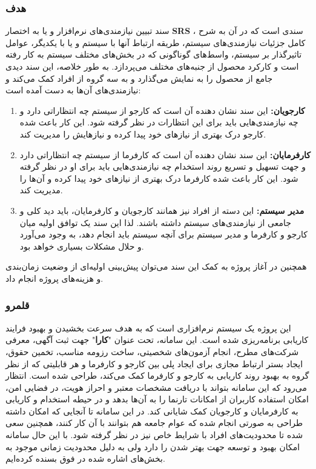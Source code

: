\documentclass[12pt]{article}
\begin{document}
	\subsubsection{هدف}
	سند تبیین نیازمندی‌های نرم‌افزار و یا به اختصار
	\textbf{SRS}
	، سندی است که در آن به شرح کامل جزئیات نیازمندی‌های سیستم، طریقه ارتباط آنها با سیستم و یا با یکدیگر، عوامل تاثیرگذار بر سیستم، واسط‌های گوناگونی که در بخش‌های مختلف سیستم به کار رفته است و کارکرد محصول از جنبه‌های مختلف می‌پردازد.
	به طور خلاصه، این سند دیدی جامع از محصول را به نمایش می‌گذارد و به سه گروه از افراد کمک می‌کند و نیازمندی‌های آن‌ها به دست آمده است:

	\begin{enumerate}
		\item
		\textbf{کارجویان:}
		این سند نشان‌ دهنده آن است که کارجو از سیستم چه انتظاراتی دارد و چه نیازمندی‌هایی باید برای این انتظارات در نظر گرفته شود. این کار باعث شده کارجو درک بهتری از نیازهای خود پیدا کرده و نیازهایش را مدیریت کند.
		\item
		\textbf{کارفرمایان:}
		این سند نشان دهنده آن است که کارفرما از سیستم چه انتظاراتی دارد و جهت تسهیل و تسریع روند استخدام چه نیازمندی‌هایی باید برای او در نظر گرفته شود. این کار باعث شده کارفرما درک بهتری از نیاز‌های خود پیدا کرده و آن‌ها را مدیریت کند.
		\item
		\textbf{مدیر سیستم:}
		این دسته از افراد نیز همانند کارجویان و کارفرمایان، باید دید کلی و جامعی از نیازمندی‌های سیستم داشته باشند. لذا این سند یک توافق اولیه میان کارجو و کارفرما و مدیر سیستم برای آنچه سیستم باید انجام دهد، به وجود می‌آورد و حلال مشکلات بسیاری خواهد بود.
	\end{enumerate}
	همچنین در آغاز پروژه به کمک این سند می‌توان پیش‌بینی اولیه‌ای از وضعیت زمان‌بندی و هزینه‌های پروژه انجام داد.

	\subsubsection{قلمرو}
	 این پروژه یک سیستم نرم‌افزاری است که به هدف سرعت بخشیدن و بهبود فرایند کاریابی برنامه‌ریزی شده است.
	این سامانه، تحت عنوان "\textbf{کارا}" جهت ثبت آگهی، معرفی شرکت‌های مطرح، انجام آزمون‌های شخصیتی، ساخت رزومه مناسب، تخمین حقوق، ایجاد بستر ارتباط مجازی برای ایجاد پلی بین کارجو و کارفرما و هر قابلیتی که از نظر گروه به بهبود روند کاریابی به کارجو و کارفرما کمک می‌کند، طراحی شده است.
	انتظار می‌رود که این سامانه بتواند با دریافت مشخصات معتبر و احراز هویت، در فضایی امن، امکان استفاده کاربران از امکانات تارنما را به آن‌ها بدهد و در حیطه استخدام و کاریابی به کارفرمایان و کارجویان کمک شایانی کند.
	در این سامانه تا آنجایی که امکان داشته طراحی به صورتی انجام شده که عوام جامعه هم بتوانند با آن کار کنند، همچنین سعی شده تا محدودیت‌های افراد با شرایط خاص نیز در نظر گرفته شود. با این حال سامانه امکان بهبود و توسعه جهت بهتر شدن را دارد ولی به دلیل محدودیت زمانی موجود به بخش‌های اشاره شده در فوق بسنده کرده‌ایم.
\end{document}
